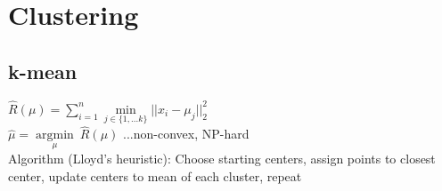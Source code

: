 \section*{Clustering}
\subsection*{k-mean}

$\hat{R}(\mu) = \sum_{i=1}^n \underset{j\in\{1,...k\}}{\operatorname{min}}||x_i-\mu_j||_2^2$\\
$\hat{\mu} =  \underset{\mu}{\operatorname{argmin}} ~ \hat{R}(\mu)$ ...non-convex, NP-hard \\
Algorithm (Lloyd's heuristic): Choose starting centers, assign points to closest center, update centers to mean of each cluster, repeat

